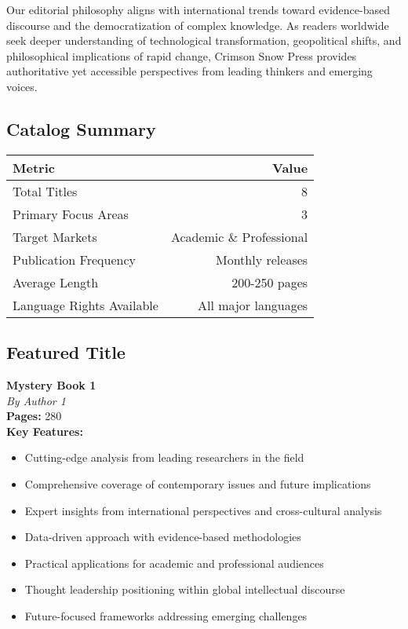 \documentclass[11pt]{article}
\begin{document}
Our editorial philosophy aligns with international trends toward evidence-based discourse and the democratization of complex knowledge. As readers worldwide seek deeper understanding of technological transformation, geopolitical shifts, and philosophical implications of rapid change, Crimson Snow Press provides authoritative yet accessible perspectives from leading thinkers and emerging voices.

\subsection{Catalog Summary}

\begin{center}
\begin{tabular}{|l|r|}
\hline
\textbf{Metric} & \textbf{Value} \\
\hline
Total Titles & 8 \\
Primary Focus Areas & 3 \\
Target Markets & Academic \& Professional \\
Publication Frequency & Monthly releases \\
Average Length & 200-250 pages \\
Language Rights Available & All major languages \\
\hline
\end{tabular}
\end{center}

\subsection{Featured Title}

\textbf{Mystery Book 1}\\
\textit{By Author 1} \\[0.4cm]

\textbf{Pages:} 280\\[0.3cm]

\textbf{Key Features:}
\begin{itemize}
\item Cutting-edge analysis from leading researchers in the field
\item Comprehensive coverage of contemporary issues and future implications
\item Expert insights from international perspectives and cross-cultural analysis
\item Data-driven approach with evidence-based methodologies
\item Practical applications for academic and professional audiences
\item Thought leadership positioning within global intellectual discourse
\item Future-focused frameworks addressing emerging challenges
\end{itemize}
\end{document}
